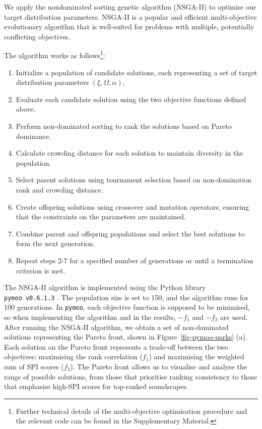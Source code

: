 \documentclass[
  authoryear,
  preprint,
  1p]{elsarticle}
\providecommand{\tightlist}{%
  \setlength{\itemsep}{0pt}\setlength{\parskip}{0pt}}\usepackage{longtable,booktabs,array}
\begin{document}
We apply the nondominated sorting genetic algorithm (NSGA-II)
\citep{Deb2002fast} to optimise our target distribution parameters.
NSGA-II is a popular and efficient multi-objective evolutionary
algorithm that is well-suited for problems with multiple, potentially
conflicting objectives.

The algorithm works as follows\footnote{Further technical details of the
  multi-objective optimisation procedure and the relevant code can be
  found in the Supplementary Material.}:

\begin{enumerate}
\def\labelenumi{\arabic{enumi}.}
\tightlist
\item
  Initialize a population of candidate solutions, each representing a
  set of target distribution parameters \((\xi, \Omega, \alpha)\).
\item
  Evaluate each candidate solution using the two objective functions
  defined above.
\item
  Perform non-dominated sorting to rank the solutions based on Pareto
  dominance.
\item
  Calculate crowding distance for each solution to maintain diversity in
  the population.
\item
  Select parent solutions using tournament selection based on
  non-domination rank and crowding distance.
\item
  Create offspring solutions using crossover and mutation operators,
  ensuring that the constraints on the parameters are maintained.
\item
  Combine parent and offspring populations and select the best solutions
  to form the next generation.
\item
  Repeat steps 2-7 for a specified number of generations or until a
  termination criterion is met.
\end{enumerate}

The NSGA-II algorithm is implemented using the Python library
\texttt{pymoo\ v0.6.1.3} \citep{pymoo}. The population size is set to
150, and the algorithm runs for 100 generations. In \texttt{pymoo}, each
objective function is supposed to be minimised, so when implementing the
algorithm and in the results, \(-f_1\) and \(-f_2\) are used. After
running the NSGA-II algorithm, we obtain a set of non-dominated
solutions representing the Pareto front, shown in
Figure~\ref{fig-pymoo-parks} (a). Each solution on the Pareto front
represents a trade-off between the two objectives: maximising the rank
correlation (\(f_1\)) and maximising the weighted sum of SPI scores
(\(f_2\)). The Pareto front allows us to visualise and analyse the range
of possible solutions, from those that prioritise ranking consistency to
those that emphasise high-SPI scores for top-ranked soundscapes.
\end{document}
